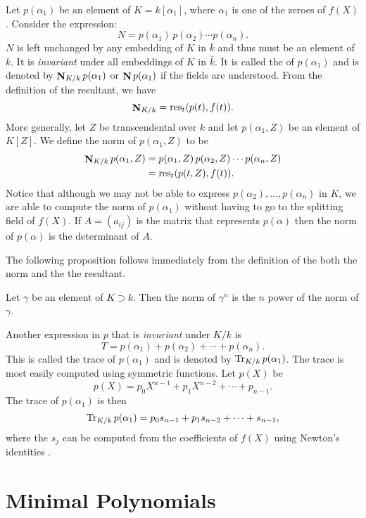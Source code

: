 Let $p(\alpha_1)$ be an element of $K = k[\alpha_1]$, where $\alpha_1$ is
one of the zeroes of $f(X)$.  Consider the expression:
\[
N = p(\alpha_1)\, p(\alpha_2) \cdots p(\alpha_n).
\]
$N$ is left unchanged by any embedding of $K$ in $\bar{k}$ and thus must be
an element of $k$.  It is {\em invariant} under all embeddings of $K$ in
$\bar{k}$.  It is called the  of $p(\alpha_1)$ and is
denoted by $\mathop{\mathbf{N}}\nolimits_{K/k} p(\alpha_1)$ or $\mathop{\mathbf{N}}\nolimits p(\alpha_1)$ if the fields
are understood.  From the definition of the resultant, we have
\[
\mathop{\mathbf{N}}\nolimits_{K/k} = \mathop{\rm res}\nolimits_{t} (p(t), f(t)).
\]
More generally, let $Z$ be transcendental over $k$ and let $p(\alpha_1, Z)$
be an element of $K[Z]$.  We define the norm of $p(\alpha_1, Z)$ to be
\[
\begin{aligned}
\mathop{\mathbf{N}}\nolimits_{K/k} p(\alpha_1, Z) 
    & = p(\alpha_1, Z)\, p(\alpha_2, Z) \cdots p(\alpha_n, Z) \\
    & = \mathop{\rm res}\nolimits_t (p(t, Z), f(t)).
\end{aligned}
\]
Notice that although we may not be able to express $p(\alpha_2), \ldots,
p(\alpha_n)$ in $K$, we are able to compute the norm of $p(\alpha_1)$
without having to go to the splitting field of $f(X)$.  If $A = (a_{ij})$ is
the matrix that represents $p(\alpha)$ then the norm of $p(\alpha)$ is the
determinant of $A$.

The following proposition follows immediately from the definition of
the both the norm and the the resultant.

\begin{proposition}
Let $\gamma$ be an element of $K \supset k$.  Then the norm of
$\gamma^n$ is the $n$\th{} power of the norm of $\gamma$.
\end{proposition}

Another expression in $p$ that is {\em invariant} under $K/k$ is
\[
T = p(\alpha_1) + p(\alpha_2) + \cdots + p(\alpha_n).
\]
This is called the trace of $p(\alpha_1)$ and is denoted by $\mathop{\rm Tr}\nolimits_{K/k}
p(\alpha_1)$.  The trace is most easily computed using symmetric
functions.  Let $p(X)$ be
\[
p(X) = p_0 X^{n-1} + p_1 X^{n-2} + \cdots + p_{n-1}.
\]
The trace of $p(\alpha_1)$ is then
\[
\mathop{\rm Tr}\nolimits_{K/k} p(\alpha_1) = p_0 s_{n-1} + p_1 s_{n-2} + \cdots + s_{n-1},
\]
where the $s_j$ can be computed from the coefficients of $f(X)$ using
Newton's identities .

\section{Minimal Polynomials}

